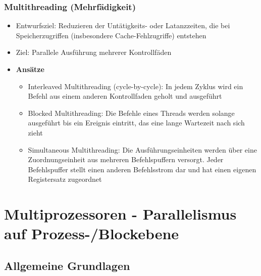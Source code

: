 \subsubsection{Multithreading (Mehrfädigkeit)}
\begin{itemize}
	\item Entwurfsziel: Reduzieren der Untätigkeits- oder Latanzzeiten, die bei Speicherzugriffen (insbesondere Cache-Fehlzugriffe) entstehen
	\item Ziel: Parallele Ausführung mehrerer Kontrollfäden
	\item \textbf{Ansätze}
	\begin{itemize}
		\item Interleaved Multithreading (cycle-by-cycle): In jedem Zyklus wird ein Befehl aus einem anderen Kontrollfaden geholt und ausgeführt
		\item Blocked Multithreading: Die Befehle eines Threads werden solange ausgeführt bis ein Ereignis eintritt, das eine lange Wartezeit nach sich zieht
		\item Simultaneous Multithreading: Die Ausführungseinheiten werden über eine Zuordnungseinheit aus mehreren Befehlspuffern versorgt. Jeder Befehlspuffer stellt einen anderen Befehlsstrom dar und hat einen eigenen Registersatz zugeordnet
	\end{itemize}
\end{itemize}



\section{Multiprozessoren - Parallelismus auf Prozess-/Blockebene}

\subsection{Allgemeine Grundlagen}

